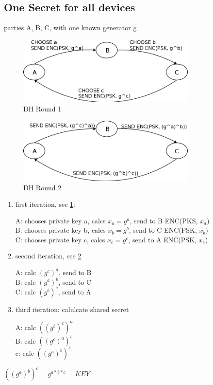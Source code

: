 \subsection{One Secret for all devices}

parties A, B, C, with one known generator g

\begin{figure}
    \centering
    \includegraphics[width=0.8\textwidth]{figures/dh-group_round1.png}
    \caption{DH Round 1}
    \label{fig:dh1}
\end{figure}

\begin{figure}
    \centering
    \includegraphics[width=0.8\textwidth]{figures/dh-group_round2.png}
    \caption{DH Round 2}
    \label{fig:dh2}
\end{figure}

\begin{enumerate}
 \item first iteration, see \ref{fig:dh1}:

A: chooses private key a, calcs $x_a = g^a$, send to B ENC(PKS, $x_a$)
\\
B: chooses private key b, calcs $x_b = g^b$, send to C ENC(PSK, $x_b$)
\\
C: chooses private key c, calcs $x_c = g^c$, send to A ENC(PSK, $x_c$)
\item second iteration, see \ref{fig:dh2}

A: calc $(g^c)^a$, send to B
\\
B: calc $(g^a)^b$, send to C
\\
C: calc $(g^b)^c$, send to A

\item third iteration: calulcate shared secret

A: calc $((g^b)^c)^a$
\\
B: calc $((g^c)^a)^b$
\\
c: calc $((g^a)^b)^c$

\end{enumerate}
$((g^a)^b)^c = g^{a*b*c} = KEY$

